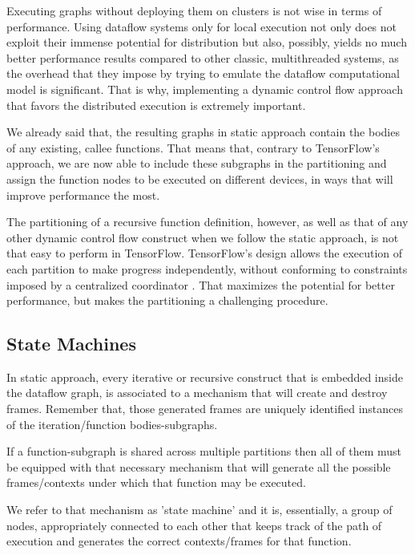 \documentclass[ack,preface]{dithesis}
\begin{document}
Executing graphs without deploying them on clusters is not wise in terms of performance.  Using dataflow systems only for local execution not only does not exploit their immense potential  for distribution but also, possibly, yields no much better performance results compared to other classic, multithreaded systems, as the overhead that they impose by trying to emulate the dataflow computational model is significant. 
That is why, implementing a dynamic control flow approach that favors the distributed execution is extremely important. 

We already said that, the resulting graphs in static approach contain the bodies of any existing, callee functions. That means that, contrary to TensorFlow's approach, we are now able to include these subgraphs in the partitioning and assign the function nodes to be executed on different devices, in ways that will improve performance the most.

The partitioning of a recursive function definition, however, as well as that of any other dynamic control flow construct  when we follow the static approach, is not that easy to perform in TensorFlow.
TensorFlow's design allows the execution of each partition to make progress independently, without conforming to constraints imposed by a centralized coordinator \cite{Yu:2018}. That maximizes the potential for better performance, but makes the partitioning a challenging procedure.


    \subsection{State Machines}

In static approach, every iterative or recursive construct that is embedded inside the dataflow graph, is associated to a mechanism that will create and destroy frames.
Remember that, those generated frames are uniquely identified instances of the iteration/function bodies-subgraphs.

If a function-subgraph is shared across multiple partitions then all of them must be equipped with that necessary mechanism that will generate all the possible frames/contexts under which that function may be executed. 

We refer to that mechanism as 'state machine' and it is, essentially, a group of nodes, appropriately connected to each other that keeps track of the path of execution and generates the correct contexts/frames for that function. 
\end{document}
